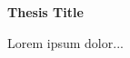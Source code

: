 \thispagestyle{plain}
\begin{center}
    \Large
    \textbf{Thesis Title}
        
    \vspace{0.4cm}
    \large
    \vspace{0.9cm}
\end{center}
Lorem ipsum dolor...